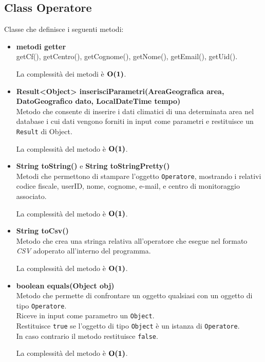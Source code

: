 \documentclass[a4paper, 12pt]{scrreprt}
\begin{document}
			\subsection{Class Operatore}
			Classe che definisce i seguenti metodi:\\
			\begin{itemize}
				\item \textbf{metodi getter}
				\\getCf(), getCentro(), getCognome(), getNome(), getEmail(), getUid().
				
				La complessit\`a dei metodi \`e $\mathbf{O}\textbf{(1)}$.
				
				\item \textbf{Result<Object> inserisciParametri(AreaGeografica area, DatoGeografico dato, LocalDateTime tempo)}
				\\Metodo che consente di inserire i dati climatici di una determinata area nel database i cui dati vengono forniti in input come parametri e restituisce un \verb!Result! di Object.
				
				La complessit\`a del metodo \`e $\mathbf{O}\textbf{(1)}$.
				
				\item \textbf{String toString()} e \textbf{String toStringPretty()}
				\\Metodi che permettono di stampare l'oggetto \verb!Operatore!, mostrando i relativi codice fiscale, userID, nome, cognome, e-mail, e centro di monitoraggio associato.
				
				La complessit\`a del metodo \`e $\mathbf{O}\textbf{(1)}$.
				
				\item \textbf{String toCsv()}
				\\Metodo che crea una stringa relativa all'operatore che esegue nel formato \textsl{CSV} adoperato all'interno del programma.
				
				La complessit\`a del metodo \`e $\mathbf{O}\textbf{(1)}$.
				
				\item \textbf{boolean equals(Object obj)}
				\\Metodo che permette di confrontare un oggetto qualsiasi con un oggetto di tipo \verb!Operatore!.
				\\Riceve in input come parametro un \verb!Object!.
				\\Restituisce \verb!true! se l'oggetto di tipo \verb!Object! \`e un istanza di \verb!Operatore!.
				\\In caso contrario il metodo restituisce \verb!false!.
				
				La complessit\`a del metodo \`e $\mathbf{O}\textbf{(1)}$.
				
			\end{itemize}
\pagebreak
\end{document}
